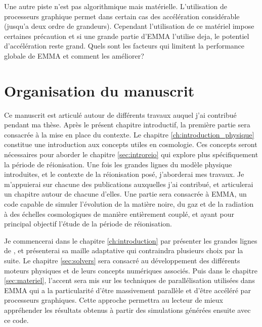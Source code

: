 Une autre piste n'est pas algorithmique mais matérielle.
L'utilisation de processeurs graphique permet dans certain cas des accélération considérable (jusqu'a deux ordre de grandeurs).
Cependant l'utilisation de ce matériel impose certaines précaution et si une grande partie d'EMMA l'utilise deja, le potentiel d'accélération reste grand.
Quels sont les facteurs qui limitent la performance globale de EMMA et comment les améliorer?





\section{Organisation du manuscrit}

Ce manuscrit est articulé autour de différents travaux auquel j'ai contribué pendant ma thèse.
Après le présent chapitre introductif, la première partie sera consacrée à la mise en place du contexte.
Le chapitre \ref{ch:introduction_physique} constitue une introduction aux concepts utiles en cosmologie.
Ces concepts seront nécessaires pour aborder le chapitre \ref{sec:introreio} qui explore plus spécifiquement la période de réionisation.
Une fois les grandes lignes du modèle physique introduites, et le contexte de la réionisation posé, j'aborderai mes travaux.
Je m'appuierai sur chacune des publications auxquelles j'ai contribué, et articulerai un chapitre autour de chacune d'elles. 
Une partie sera consacrée à EMMA, un code capable de simuler l'évolution de la matière noire, du gaz et de la radiation à des échelles cosmologiques de manière entièrement couplé, et ayant pour principal objectif l'étude de la période de réionisation.

Je commencerai dans le chapitre \ref{ch:introduction} par présenter les grandes lignes de \emma, et présenterai sa maille adaptative qui contraindra plusieurs choix par la suite.
Le chapitre \ref{sec:solvers} sera consacré au développement des différents moteurs physiques et de leurs concepts numériques associés.
Puis dans le chapitre \ref{sec:materiel}, l'accent sera mis sur les techniques de parallélisation utilisées dans EMMA qui a la particularité d'être massivement parallèle et d'être accéléré par processeurs graphiques.
Cette approche permettra au lecteur de mieux appréhender les résultats obtenus à partir des simulations générées ensuite avec ce code.

